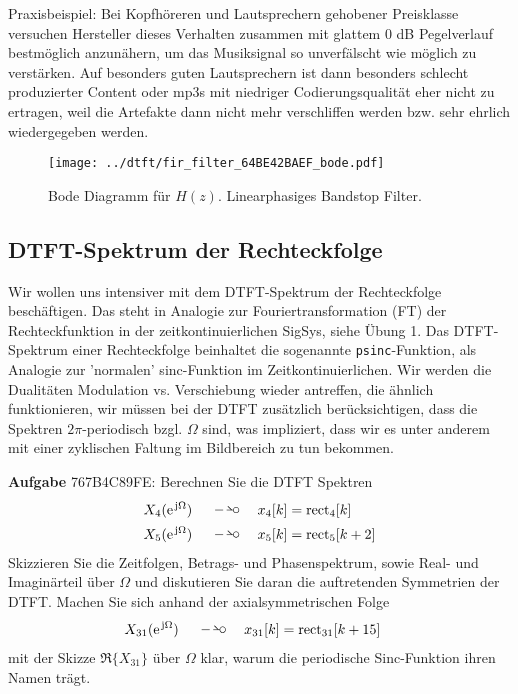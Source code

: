 Praxisbeispiel:
Bei Kopfhöreren und Lautsprechern gehobener Preisklasse versuchen Hersteller
dieses Verhalten zusammen mit glattem 0 dB Pegelverlauf bestmöglich anzunähern,
um das Musiksignal so unverfälscht wie möglich zu verstärken.
%
Auf besonders guten Lautsprechern ist dann besonders schlecht produzierter
Content oder mp3s mit niedriger Codierungsqualität eher nicht zu ertragen, weil
die Artefakte dann nicht mehr verschliffen werden bzw. sehr ehrlich
wiedergegeben werden.
%


\begin{figure}
\centering
\texttt{[image: ../dtft/fir\_filter\_64BE42BAEF\_bode.pdf]}
\caption{Bode Diagramm für $H(z)$. Linearphasiges Bandstop Filter.}
\label{fig:fir_filter_64BE42BAEF_bode}
\end{figure}










\clearpage
\subsection{DTFT-Spektrum der Rechteckfolge}
\label{sec:767B4C89FE}
\begin{Ziel}
Wir wollen uns intensiver mit dem DTFT-Spektrum der Rechteckfolge beschäftigen.
Das steht in Analogie zur Fouriertransformation (FT) der Rechteckfunktion in
der zeitkontinuierlichen SigSys, siehe Übung 1.
Das DTFT-Spektrum einer Rechteckfolge beinhaltet die sogenannte \texttt{psinc}-Funktion,
als Analogie zur 'normalen' sinc-Funktion im Zeitkontinuierlichen.
%
Wir werden die Dualitäten Modulation vs. Verschiebung wieder antreffen, die ähnlich
funktionieren, wir müssen bei der DTFT zusätzlich berücksichtigen, dass
die Spektren $2\pi$-periodisch bzgl. $\Omega$ sind, was impliziert, dass
wir es unter anderem mit einer zyklischen Faltung im Bildbereich zu tun bekommen.
%
\end{Ziel}
\textbf{Aufgabe} {\tiny 767B4C89FE}: Berechnen Sie die DTFT Spektren
\begin{align}
X_4(\e^{\im\Omega}) \quad\DTFT\quad & x_4[k] = \mathrm{rect}_4[k]\\
X_5(\e^{\im\Omega}) \quad\DTFT\quad & x_5[k] = \mathrm{rect}_5[k+2]
\end{align}
Skizzieren Sie die Zeitfolgen, Betrags- und Phasenspektrum, sowie
Real- und Imaginärteil über $\Omega$ und diskutieren Sie daran die auftretenden
Symmetrien der DTFT.
%
Machen Sie sich anhand der axialsymmetrischen Folge
\begin{align}
X_{31}(\e^{\im\Omega}) \quad\DTFT\quad & x_{31}[k] = \mathrm{rect}_{31}[k+15]
\end{align}
mit der Skizze $\Re\{X_{31}\}$ über $\Omega$ klar, warum die periodische
Sinc-Funktion ihren Namen trägt.


